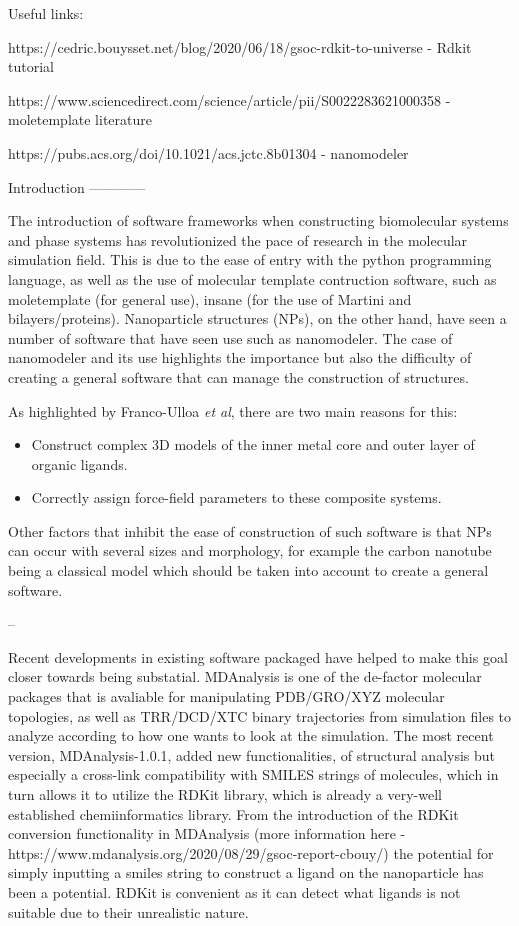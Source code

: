 Useful links:

https://cedric.bouysset.net/blog/2020/06/18/gsoc-rdkit-to-universe - Rdkit tutorial

https://www.sciencedirect.com/science/article/pii/S0022283621000358 - moletemplate literature


https://pubs.acs.org/doi/10.1021/acs.jctc.8b01304 - nanomodeler 

Introduction
------------

The introduction of software frameworks when constructing biomolecular systems and phase systems has revolutionized the pace of research in the
molecular simulation field. This is due to the ease of entry with the python programming language, as well as the use of molecular template contruction software,
such as moletemplate (for general use), insane (for the use of Martini and bilayers/proteins). Nanoparticle structures (NPs), on the other hand, have seen a number of software that
have seen use such as nanomodeler. The case of nanomodeler and its use highlights the importance but also the difficulty of creating a general software that can manage the
construction of structures.

As highlighted by Franco-Ulloa \emph{et al}, there are two main reasons for this:
\begin{itemize}
\item Construct complex 3D models of the inner metal core and outer layer of organic ligands.
\item Correctly assign force-field parameters to these composite systems.
\end{itemize} 
Other factors that inhibit the ease of construction of such software is that NPs can occur with several sizes and morphology, for example the carbon nanotube being a classical
model which should be taken into account to create a general software. 

--

Recent developments in existing software packaged have helped to make this goal closer towards being substatial. MDAnalysis is one of the de-factor molecular packages that
is avaliable for manipulating PDB/GRO/XYZ molecular topologies, as well as TRR/DCD/XTC binary trajectories from simulation files to analyze according to how one wants to look at the simulation. 
The most recent version, MDAnalysis-1.0.1, added new functionalities, of structural analysis but especially a cross-link compatibility with SMILES strings of molecules, which in turn
allows it to utilize the RDKit library, which is already a very-well established chemiinformatics library. From the introduction of the RDKit conversion functionality in MDAnalysis (more information here - https://www.mdanalysis.org/2020/08/29/gsoc-report-cbouy/) the potential for simply inputting a smiles string to construct a ligand on the nanoparticle has been a potential. RDKit is convenient as it can detect what ligands is not suitable due to
their unrealistic nature.

